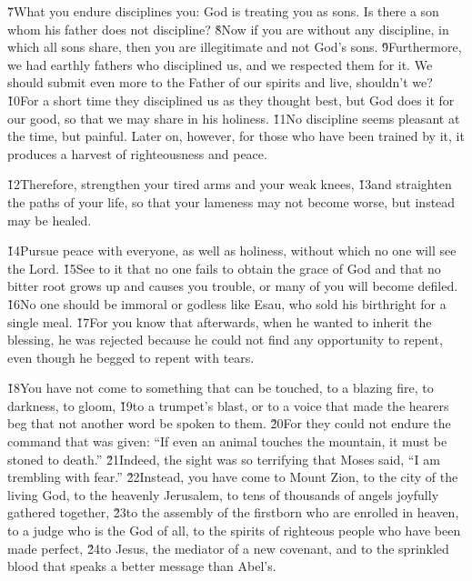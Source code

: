 \v{7}What you endure disciplines you: God is treating you as sons. Is there a son whom his father does not discipline? \v{8}Now if you are without any discipline, in which all sons share, then you are illegitimate and not God's sons. \v{9}Furthermore, we had earthly fathers who disciplined us, and we respected them for it. We should submit even more to the Father of our spirits and live, shouldn't we? \v{10}For a short time they disciplined us as they thought best, but God does it for our good, so that we may share in his holiness. \v{11}No discipline seems pleasant at the time, but painful. Later on, however, for those who have been trained by it, it produces a harvest of righteousness and peace.

\v{12}Therefore, strengthen your tired arms and your weak knees, \v{13}and straighten the paths of your life, so that your lameness may not become worse, but instead may be healed.

\v{14}Pursue peace with everyone, as well as holiness, without which no one will see the Lord. \v{15}See to it that no one fails to obtain the grace of God and that no bitter root grows up and causes you trouble, or many of you will become defiled. \v{16}No one should be immoral or godless like Esau, who sold his birthright for a single meal. \v{17}For you know that afterwards, when he wanted to inherit the blessing, he was rejected because he could not find any opportunity to repent, even though he begged to repent with tears.

\v{18}You have not come to something that can be touched, to a blazing fire, to darkness, to gloom, \v{19}to a trumpet's blast, or to a voice that made the hearers beg that not another word be spoken to them. \v{20}For they could not endure the command that was given: ``If even an animal touches the mountain, it must be stoned to death.'' \v{21}Indeed, the sight was so terrifying that Moses said, ``I am trembling with fear.'' \v{22}Instead, you have come to Mount Zion, to the city of the living God, to the heavenly Jerusalem, to tens of thousands of angels joyfully gathered together, \v{23}to the assembly of the firstborn who are enrolled in heaven, to a judge who is the God of all, to the spirits of righteous people who have been made perfect, \v{24}to Jesus, the mediator of a new covenant, and to the sprinkled blood that speaks a better message than Abel's.

